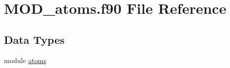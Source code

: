 \hypertarget{MOD__atoms_8f90}{\section{M\-O\-D\-\_\-atoms.\-f90 File Reference}
\label{MOD__atoms_8f90}
}
\subsection*{Data Types}
\begin{DoxyCompactItemize}
\item 
module \hyperlink{classatoms}{atoms}
\end{DoxyCompactItemize}
